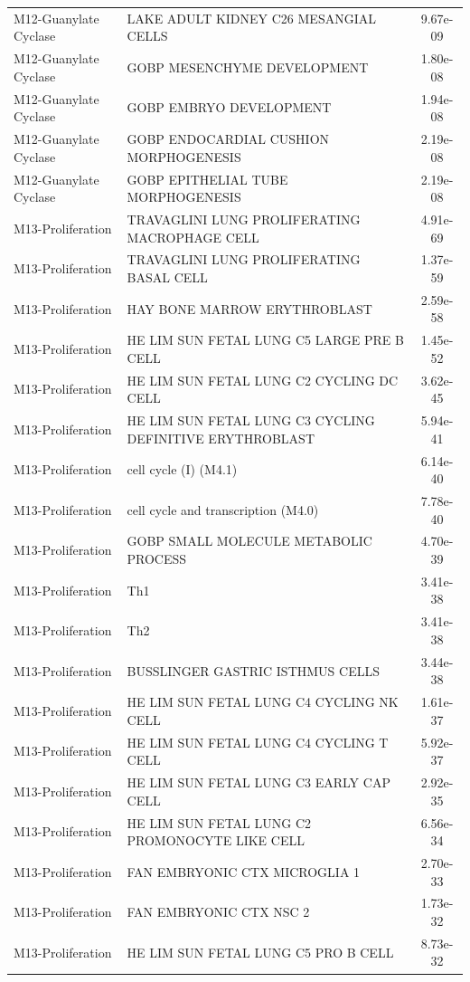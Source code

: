 \documentclass[
]{article}
\begin{document}
\begin{singlespace}
\begin{longtable}[t]{>{\raggedright\arraybackslash}p{1.4in}>{\raggedright\arraybackslash}p{4.5in}c}
\addlinespace
M12-Guanylate Cyclase & LAKE ADULT KIDNEY C26 MESANGIAL CELLS & 9.67e-09\\
M12-Guanylate Cyclase & GOBP MESENCHYME DEVELOPMENT & 1.80e-08\\
M12-Guanylate Cyclase & GOBP EMBRYO DEVELOPMENT & 1.94e-08\\
M12-Guanylate Cyclase & GOBP ENDOCARDIAL CUSHION MORPHOGENESIS & 2.19e-08\\
M12-Guanylate Cyclase & GOBP EPITHELIAL TUBE MORPHOGENESIS & 2.19e-08\\
\addlinespace
M13-Proliferation & TRAVAGLINI LUNG PROLIFERATING MACROPHAGE CELL & 4.91e-69\\
M13-Proliferation & TRAVAGLINI LUNG PROLIFERATING BASAL CELL & 1.37e-59\\
M13-Proliferation & HAY BONE MARROW ERYTHROBLAST & 2.59e-58\\
M13-Proliferation & HE LIM SUN FETAL LUNG C5 LARGE PRE B CELL & 1.45e-52\\
M13-Proliferation & HE LIM SUN FETAL LUNG C2 CYCLING DC CELL & 3.62e-45\\
\addlinespace
M13-Proliferation & HE LIM SUN FETAL LUNG C3 CYCLING DEFINITIVE ERYTHROBLAST & 5.94e-41\\
M13-Proliferation & cell cycle (I) (M4.1) & 6.14e-40\\
M13-Proliferation & cell cycle and transcription (M4.0) & 7.78e-40\\
M13-Proliferation & GOBP SMALL MOLECULE METABOLIC PROCESS & 4.70e-39\\
M13-Proliferation & Th1 & 3.41e-38\\
\addlinespace
M13-Proliferation & Th2 & 3.41e-38\\
M13-Proliferation & BUSSLINGER GASTRIC ISTHMUS CELLS & 3.44e-38\\
M13-Proliferation & HE LIM SUN FETAL LUNG C4 CYCLING NK CELL & 1.61e-37\\
M13-Proliferation & HE LIM SUN FETAL LUNG C4 CYCLING T CELL & 5.92e-37\\
M13-Proliferation & HE LIM SUN FETAL LUNG C3 EARLY CAP CELL & 2.92e-35\\
\addlinespace
M13-Proliferation & HE LIM SUN FETAL LUNG C2 PROMONOCYTE LIKE CELL & 6.56e-34\\
M13-Proliferation & FAN EMBRYONIC CTX MICROGLIA 1 & 2.70e-33\\
M13-Proliferation & FAN EMBRYONIC CTX NSC 2 & 1.73e-32\\
M13-Proliferation & HE LIM SUN FETAL LUNG C5 PRO B CELL & 8.73e-32\\

\end{longtable}
\end{singlespace}
\end{document}
